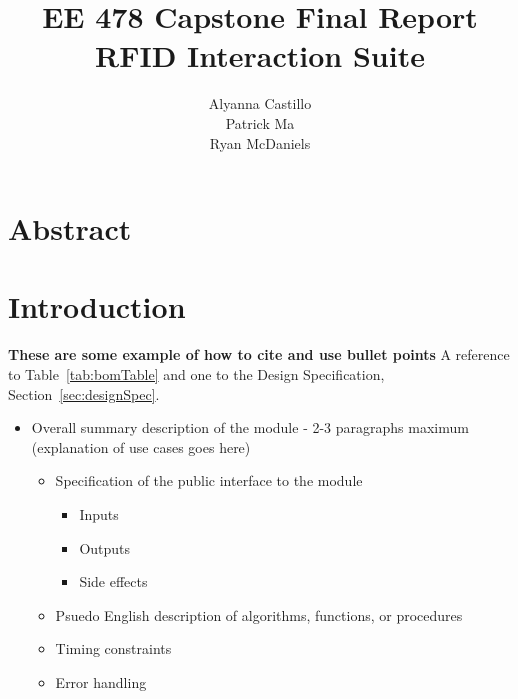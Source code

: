 \documentclass[12pt]{article} %
\title{\TitleFont EE 478 Capstone Final Report \\ RFID Interaction Suite \vfill }
\author{\AuthorFont Alyanna Castillo \\ Patrick Ma \\ Ryan McDaniels}
\date{}
\begin{document}
\maketitle
\thispagestyle{empty}
\pagebreak \tableofcontents
\listoftables
\listoffigures
\thispagestyle{empty}
\pagebreak
\setcounter{page}{1}

\section{Abstract}
% 

\section{Introduction}



\textbf{These are some example of how to cite and use bullet points}
A reference to Table~\ref{tab:bomTable} and one to the Design Specification, Section~\ref{sec:designSpec}.

\begin{itemize}
	\item Overall summary description of the module - 2-3 paragraphs maximum
		(explanation of use cases goes here)

		\begin{itemize}
			\item Specification of the public interface to the module

				\begin{itemize}
					\item Inputs
					\item Outputs
					\item Side effects
				\end{itemize}

			\item Psuedo English description of algorithms, functions, or procedures
			\item Timing constraints
			\item Error handling
		\end{itemize}
\end{itemize}
\end{document}
